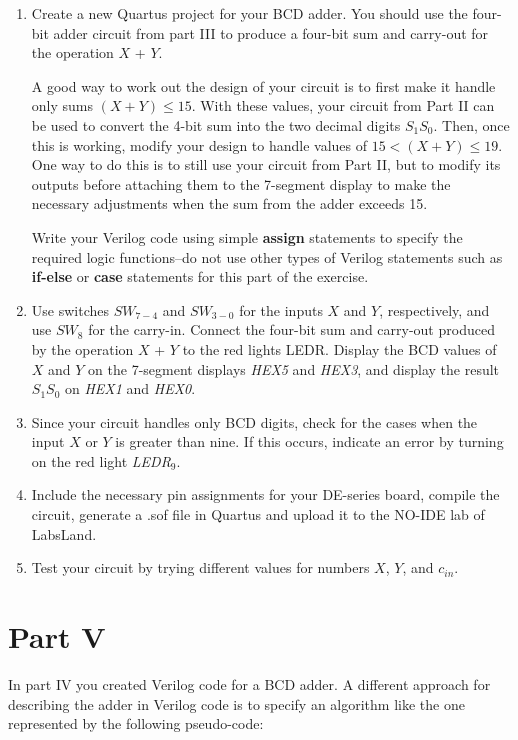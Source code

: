 \documentclass[epsfig,10pt,fullpage]{article}
\begin{document}
\begin{enumerate}
\item Create a new Quartus project for your BCD adder. You should use the
four-bit adder circuit from part III to produce a four-bit sum and carry-out for the
operation $X$ + $Y$. 

A good way to work out the design of your circuit is to first make it handle only sums
$(X + Y) \le 15$. With these values, your circuit from Part II can be used to convert the
4-bit sum into the two decimal digits $S_1 S_0$.  Then, once this is working, modify 
your design to handle values of $15 < (X + Y) \le 19$. One way to do this is to still use 
your circuit from Part II, but to modify its outputs before attaching them to the 7-segment 
display to make the necessary adjustments when the sum from the adder exceeds 15.

Write your Verilog code using
simple {\bf assign} statements to specify the required logic functions--do not use 
other types of Verilog
statements such as {\bf if-else} or {\bf case} statements for this part of the exercise.
\item Use switches $SW_{7-4}$ and $SW_{3-0}$ for the inputs $X$ and $Y$, respectively, and
use $SW_{8}$ for the carry-in. Connect the four-bit sum and carry-out produced 
by the operation $X$ + $Y$ to the red lights LEDR. Display the BCD values of $X$
and $Y$ on the 7-segment displays {\it HEX5} and {\it HEX3}, and display the result $S_1 S_0$ on
{\it HEX1} and {\it HEX0}.
\item Since your circuit handles only BCD digits, check for the cases when the input 
$X$ or $Y$ is greater than nine. If this occurs, indicate an error by turning on 
the red light {\it LEDR}$_9$.
\item Include the necessary pin assignments for your DE-series board, compile the circuit, generate a .sof file in Quartus and upload it to the NO-IDE lab of LabsLand.
\item Test your circuit by trying different values for numbers $X$, $Y$, and $c_{in}$.
\end{enumerate}

\section*{Part V}
In part IV you created Verilog code for a BCD adder. A different approach for describing
the adder in Verilog code is to specify an algorithm like the one
represented by the following pseudo-code:
\end{document}
